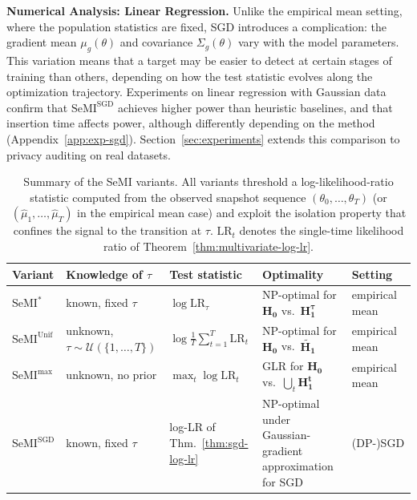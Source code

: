 \documentclass{article}
\theoremstyle{plain}
\theoremstyle{definition}
\theoremstyle{remark}
\newcommand{\SeMIstar}{\mathrm{SeMI}^{\ast}}
\newcommand{\SeMISGD}{\mathrm{SeMI}^{\mathrm{SGD}}}
\newcommand{\SeMIunif}{\mathrm{SeMI}^{\mathrm{Unif}}}
\newcommand{\SeMImax}{\mathrm{SeMI}^{\max}}
\newcommand{\cU}{\mathcal{U}}
\begin{document}
\iffalse
    {\color{red}
    \textbf{Numerical Analysis: Linear Regression.}
    Unlike the empirical mean setting, where the population statistics are fixed, SGD introduces a complication: the gradient mean $\mu_g(\theta)$ and covariance $\Sigma_g(\theta)$ vary with the model parameters. This variation means that a target may be easier to detect at certain stages of training than others, depending on how the test statistic evolves along the optimization trajectory. Experiments on linear regression with Gaussian data confirm that $\SeMISGD$ achieves higher power than heuristic baselines, and that insertion time affects power, although differently depending on the method (Appendix~\ref{app:exp-sgd}). Section~\ref{sec:experiments} extends this comparison to privacy auditing on real datasets.}

    \begin{table}[t]
        \centering
        \footnotesize
        \caption{Summary of the SeMI variants. All variants threshold a log-likelihood-ratio statistic computed from the observed snapshot sequence $(\theta_0,\dots,\theta_T)$ (or $(\hat\mu_1,\dots,\hat\mu_T)$ in the empirical mean case) and exploit the isolation property that confines the signal to the transition at $\tau$. $\mathrm{LR}_t$ denotes the single-time likelihood ratio of Theorem~\ref{thm:multivariate-log-lr}.}
        \label{tab:semi_variants}
        \begin{tabular}{lllll}
            \toprule
            Variant     & Knowledge of $\tau$                     & Test statistic                               & Optimality                                                    & Setting        \\
            \midrule
            $\SeMIstar$ & known, fixed $\tau$                     & $\log \mathrm{LR}_\tau$                      & NP-optimal for $\mathbf{H_0}$ vs.\ $\mathbf{H_1^\tau}$        & empirical mean \\
            $\SeMIunif$ & unknown, $\tau \sim \cU(\{1,\dots,T\})$ & $\log\frac{1}{T}\sum_{t=1}^{T}\mathrm{LR}_t$ & NP-optimal for $\mathbf{H_0}$ vs.\ $\widetilde{\mathbf{H_1}}$ & empirical mean \\
            $\SeMImax$  & unknown, no prior                       & $\max_{t}\log \mathrm{LR}_t$                 & GLR for $\mathbf{H_0}$ vs.\ $\bigcup_{t}\mathbf{H_1^t}$       & empirical mean \\
            $\SeMISGD$  & known, fixed $\tau$                     & log-LR of Thm.~\ref{thm:sgd-log-lr}          & NP-optimal under Gaussian-gradient approximation for SGD      & (DP-)SGD       \\
            \bottomrule
        \end{tabular}
    \end{table}
\end{document}
